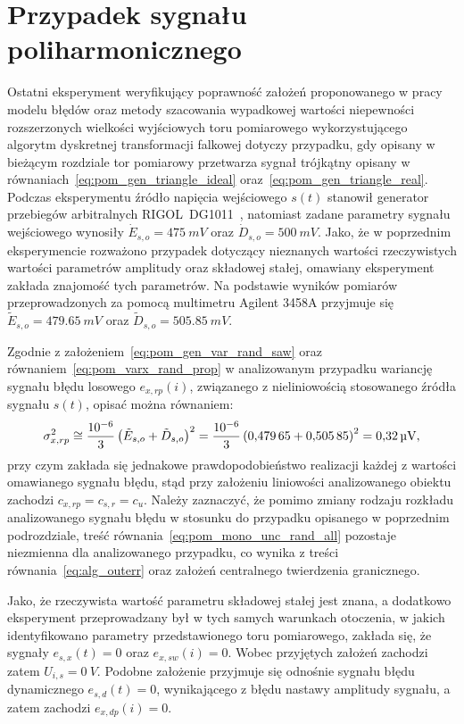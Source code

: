 \section{Przypadek sygnału poliharmonicznego}

Ostatni eksperyment weryfikujący poprawność założeń proponowanego w pracy modelu błędów oraz metody szacowania wypadkowej wartości niepewności rozszerzonych wielkości wyjściowych toru pomiarowego wykorzystującego algorytm dyskretnej transformacji falkowej dotyczy przypadku, gdy opisany w bieżącym rozdziale tor pomiarowy przetwarza sygnał trójkątny opisany w równaniach~\eqref{eq:pom_gen_triangle_ideal} oraz~\eqref{eq:pom_gen_triangle_real}. Podczas eksperymentu źródło napięcia wejściowego $s(t)$ stanowił generator przebiegów arbitralnych RIGOL~DG1011~\cite{rigol_fawg}, natomiast zadane parametry sygnału wejściowego wynosiły $\dot{E}_{s,o} = \qty{475}{mV}$ oraz $\dot{D}_{s,o} = \qty{500}{mV}$. Jako, że w poprzednim eksperymencie rozważono przypadek dotyczący nieznanych wartości rzeczywistych wartości parametrów amplitudy oraz składowej stałej, omawiany eksperyment zakłada znajomość tych parametrów. Na podstawie wyników pomiarów przeprowadzonych za pomocą multimetru Agilent 3458A przyjmuje się $\tilde{E}_{s,o} = \qty{479.65}{mV}$ oraz $\tilde{D}_{s,o} = \qty{505.85}{mV}$.

Zgodnie z założeniem~\eqref{eq:pom_gen_var_rand_saw} oraz równaniem~\eqref{eq:pom_varx_rand_prop} w analizowanym przypadku wariancję sygnału błędu losowego $e_{x,rp}(i)$, związanego z nieliniowością stosowanego źródła sygnału $s(t)$, opisać można równaniem:
\begin{equation}
\sigma_{x,rp}^{2} \cong \frac{\num{e-6}}{3} \left(\tilde{E}_{s,o} + \tilde{D}_{s,o}\right)^{2} = \frac{\num{e-6}}{3} \left(\num{0.47965} + \num{0.50585}\right)^{2} = \qty{0.32}{\micro V} \label{eq:pom_multi_rand_var_in},
\end{equation}
przy czym zakłada się jednakowe prawdopodobieństwo realizacji każdej z wartości omawianego sygnału błędu, stąd przy założeniu liniowości analizowanego obiektu zachodzi $c_{x,rp} = c_{s,r} = c_{u}$. Należy zaznaczyć, że pomimo zmiany rodzaju rozkładu analizowanego sygnału błędu w stosunku do przypadku opisanego w poprzednim podrozdziale, treść równania~\eqref{eq:pom_mono_unc_rand_all} pozostaje niezmienna dla analizowanego przypadku, co wynika z treści równania~\eqref{eq:alg_outerr} oraz założeń centralnego twierdzenia granicznego.

Jako, że rzeczywista wartość parametru składowej stałej jest znana, a dodatkowo eksperyment przeprowadzany był w tych samych warunkach otoczenia, w jakich identyfikowano parametry przedstawionego toru pomiarowego, zakłada się, że sygnały  $e_{s,x}(t) = 0$ oraz $e_{x,sw}(i) = 0$. Wobec przyjętych założeń zachodzi zatem $U_{i,s} = \qty{0}{V}$. Podobne założenie przyjmuje się odnośnie sygnału błędu dynamicznego $e_{s,d}(t) = 0$, wynikającego z błędu nastawy amplitudy sygnału, a zatem zachodzi $e_{x,dp}(i) = 0$.

